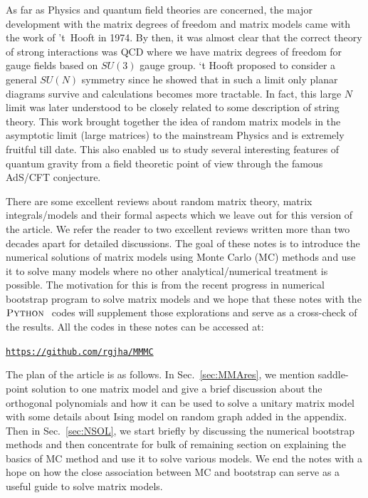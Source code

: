 \documentclass[11pt]{article}
\newcommand{\PY}{\textsc{Python }}
\begin{document}
As far as Physics and quantum field theories are concerned, the major development
with the matrix degrees of freedom and matrix models came 
with the work of 't~Hooft in 1974. By then, it was almost clear that the correct theory of 
strong interactions was QCD where we have matrix degrees of freedom for gauge fields
based on $SU(3)$ gauge group. `t Hooft proposed to consider a general $SU(N)$ 
symmetry since he showed that in such a limit only planar diagrams survive and calculations becomes
more tractable. In fact, this large $N$ limit was later understood to be closely related to some
description of string theory. This work brought together the idea of random matrix models
in the asymptotic limit (large matrices) to the mainstream Physics and is extremely fruitful till date. 
This also enabled us to study several interesting features of quantum gravity 
from a field theoretic point of view through the famous AdS/CFT conjecture.

There are some excellent reviews about random matrix theory, matrix integrals/models and their formal aspects 
which we leave out for this version of the article. We refer the reader to two excellent reviews written more than two decades 
apart \cite{DiFrancesco:1993cyw,Eynard:2015aea} for detailed discussions. 
The goal of these notes is to introduce the numerical solutions of matrix models using 
Monte Carlo (MC) methods and use it to solve many models where no other analytical/numerical 
treatment is possible. The motivation for this is from the recent progress in numerical bootstrap program to 
solve matrix models and we hope that these notes with the $\PY$ codes will supplement
those explorations and serve as a cross-check of the results. All the codes in these notes can be accessed at:  
\begin{center} \texttt{\href{https://github.com/rgjha/MMMC}{https://github.com/rgjha/MMMC}} \end{center}

The plan of the article is as follows. In Sec.~\ref{sec:MMAres}, we mention saddle-point solution 
to one matrix model and give a brief discussion about the orthogonal polynomials and how it can be used to 
solve a unitary matrix model with some details about Ising model on random graph added in the appendix. 
Then in Sec.~\ref{sec:NSOL}, we start briefly by discussing the numerical bootstrap methods 
and then concentrate for bulk of remaining section on
explaining the basics of MC method and use it to solve various models. 
We end the notes with a hope on how the close association between MC 
and bootstrap can serve as a useful guide to solve matrix models. 
\end{document}
